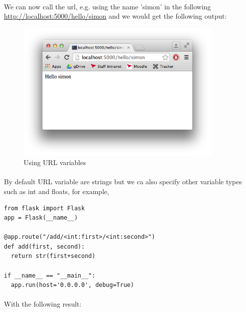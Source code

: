 \documentclass[12pt, a4paper, twoside]{book}
\begin{document}
\paragraph{} We can now call the url, e.g. using the name 'simon' in the following \url{http://localhost:5000/hello/simon} and we would get the following output:

\begin{figure}[H]
\centering
\includegraphics[width=0.9\textwidth]{images/flask-url-variables.png}
\caption{Using URL variables}
\label{fig:flask-url-variables}
\end{figure}

\paragraph{} By default URL variable are strings but we ca also specify other variable types such as int and floats, for example,

\begin{lstlisting}
from flask import Flask
app = Flask(__name__)

@app.route("/add/<int:first>/<int:second>")
def add(first, second):
  return str(first+second)

if __name__ == "__main__":
  app.run(host='0.0.0.0', debug=True)
\end{lstlisting}

\paragraph{} With the following result:
\end{document}
